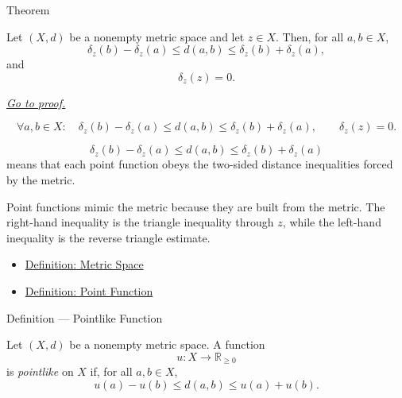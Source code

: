 \begin{theorembox}{Theorem}
\begin{theorem}
\label{thm:metric-point-function-inequalities}
Let \((X,d)\) be a nonempty metric space and let \(z\in X\).  Then, for all
\(a,b\in X\),
\[
  \delta_z(b)-\delta_z(a)\leq d(a,b)\leq \delta_z(b)+\delta_z(a),
\]
and
\[
  \delta_z(z)=0.
\]

\smallskip
\noindent
\hyperref[prf:metric-point-function-inequalities]{\textit{Go to proof.}}
\end{theorem}
\end{theorembox}

\begin{remark*}
\[
\forall a,b\in X{:}\quad
\delta_z(b)-\delta_z(a)\leq d(a,b)\leq \delta_z(b)+\delta_z(a),
\qquad
\delta_z(z)=0.
\]
\end{remark*}

\begin{remark*}
\[
\delta_z(b)-\delta_z(a)\leq d(a,b)\leq \delta_z(b)+\delta_z(a)
\]
means that each point function obeys the two-sided distance inequalities
forced by the metric.
\end{remark*}

\begin{remark*}[Interpretation]
Point functions mimic the metric because they are built from the metric.  The
right-hand inequality is the triangle inequality through \(z\), while the
left-hand inequality is the reverse triangle estimate.
\end{remark*}

\begin{dependencies}
\begin{itemize}
  \item \hyperref[def:metric-space]{Definition: Metric Space}
  \item \hyperref[def:metric-point-function]{Definition: Point Function}
\end{itemize}
\end{dependencies}

\begin{definitionbox}{Definition --- Pointlike Function}
\begin{definition}\label{def:metric-pointlike-function}
Let \((X,d)\) be a nonempty metric space.  A function
\[
  u:X\to\mathbb{R}_{\geq 0}
\]
is \emph{pointlike} on \(X\) if, for all \(a,b\in X\),
\[
  u(a)-u(b)\leq d(a,b)\leq u(a)+u(b).
\]
\end{definition}
\end{definitionbox}

